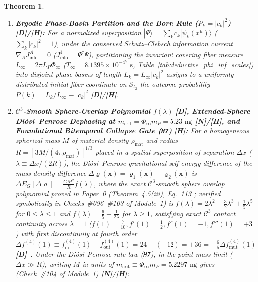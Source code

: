 \documentclass[11pt,a4paper]{article}
\newcommand{\catD}{\textbf{\textcolor{blue!75!black}{[D]}}}
\newcommand{\catH}{\textbf{\textcolor{orange!85!black}{[H]}}}
\newcommand{\catN}{\textbf{\textcolor{teal!75!black}{[N]}}}
\newtheorem{theorem}{Theorem}[section]
\theoremstyle{definition}
\theoremstyle{remark}
\begin{document}
\begin{theorem}
\begin{enumerate}
  \begin{equation}
    \Delta s_5^2 = -A(x)\,c^2\Delta t_1^2 - \Phi(x)^2 c^2\Delta t_2^2 + \Delta\ell_{\Sigma_3}^2 = 0 \;\;\Big|_{\Delta t_1 = 0} \quad \Longleftrightarrow \quad \Delta\ell_{\Sigma_3} = \int_{\mathcal{C}_{t_2}} \Phi(x)\,c\,dt_2.
    \label{eq:exact_5d_null_cone_er_epr}
  \end{equation}
  \item[\textnormal{(iii)}] \textbf{Ergodic Phase-Basin Partition and the Born Rule ($P_k = |c_k|^2$) \catD/\catH:} For a normalized superposition $|\Psi\rangle = \sum_k c_k |\psi_k(x^{\mu})\rangle$ ($\sum_k |c_k|^2 = 1$), under the conserved Schutz--Clebsch information current $\nabla_A J_{\text{info}}^A = 0$ ($J_{\text{info}}^1 = \Psi^\dagger\Psi$), partitioning the invariant covering fiber measure $L_{\infty} = 2\pi L_P\Phi_{\infty}$ ($T_{\infty} = 8.1395 \times 10^{-47}\text{ s}$, Table~\ref{tab:deductive_phi_inf_scales}) into disjoint phase basins of length $L_k = L_{\infty}|c_k|^2$ assigns to a uniformly distributed initial fiber coordinate on $\mathcal{S}_{t_2}$ the outcome probability $P(k) = L_k / L_{\infty} \equiv |c_k|^2$ \catD/\catH.
  \item[\textnormal{(iv)}] \textbf{$\mathcal{C}^3$-Smooth Sphere-Overlap Polynomial $f(\lambda)$ \catD, Extended-Sphere Di\'osi--Penrose Dephasing at $m_{\text{crit}} = \Phi_{\infty}m_P = 5.23\text{ ng}$ \catN/\catH, and Foundational Bitemporal Collapse Gate (\texttt{H7}) \catH:} For a homogeneous spherical mass $M$ of material density $\rho_{\text{mat}}$ and radius $R = [3M/(4\pi\rho_{\text{mat}})]^{1/3}$ placed in a spatial superposition of separation $\Delta x$ ($\lambda \equiv \Delta x/(2R)$), the Di\'osi--Penrose gravitational self-energy difference of the mass-density difference $\Delta\varrho(\mathbf{x}) = \varrho_1(\mathbf{x}) - \varrho_2(\mathbf{x})$ is $\Delta E_G[\Delta\varrho] = \frac{G M^2}{R}f(\lambda)$, where the exact $\mathcal{C}^3$-smooth sphere overlap polynomial proved in Paper~0 (Theorem~4.5(iii), Eq.~113 \cite{JV_Paper0}; verified symbolically in Checks~\#096--\#103 of Module~1) is $f(\lambda) = 2\lambda^2 - \frac{3}{2}\lambda^3 + \frac{1}{5}\lambda^5$ for $0 \le \lambda \le 1$ and $f(\lambda) = \frac{6}{5} - \frac{1}{2\lambda}$ for $\lambda \ge 1$, satisfying exact $\mathcal{C}^3$ contact continuity across $\lambda = 1$ ($f(1) = \frac{7}{10}, f'(1) = \frac{1}{2}, f''(1) = -1, f'''(1) = +3$) with first discontinuity at fourth order $\Delta f^{(4)}(1) \equiv f_{\text{in}}^{(4)}(1) - f_{\text{out}}^{(4)}(1) = 24 - (-12) = +36 = -\frac{6}{5}\Delta f_{\text{mut}}^{(4)}(1)$ \catD\ \cite{Penrose1996,Donadi2021,JV_Paper0}. Under the Di\'osi--Penrose rate law (\texttt{H7}), in the point-mass limit ($\Delta x \gg R$), writing $M$ in units of $m_{\text{crit}} \equiv \Phi_{\infty}m_P = 5.2297\text{ ng}$ gives (Check~\#104 of Module~1) \catN/\catH:

\end{enumerate}
\end{theorem}
\end{document}
